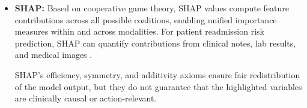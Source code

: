 \documentclass[pdflatex,sn-mathphys-num]{sn-jnl}%
\theoremstyle{thmstyleone}%
\theoremstyle{thmstyletwo}%
\theoremstyle{thmstylethree}%
\begin{document}
\begin{itemize}
    \item \textbf{SHAP:} Based on cooperative game theory, SHAP values compute feature contributions across all possible coalitions, enabling unified importance measures within and across modalities. For patient readmission risk prediction, SHAP can quantify contributions from clinical notes, lab results, and medical images \cite{lundberg2017unifiedapproachinterpretingmodel,mienye2024optimized}. %
    
    \begin{tcolorbox}[colback=yellow!5,colframe=yellow!75!black,title=\textbf{Mathematical Note: Axioms Do Not Imply Clinical Validity}]
    SHAP's efficiency, symmetry, and additivity axioms ensure fair redistribution of the model output, but they do not guarantee that the highlighted variables are clinically causal or action-relevant.
    \end{tcolorbox}
    

\end{itemize}
\end{document}
